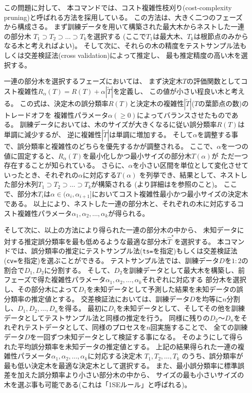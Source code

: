 この問題に対して、
本コマンドでは、コスト複雑性枝刈り(cost-complexity pruning)と呼ばれる方法\cite{Breiman84}を採用している。
この方法は、大きく二つのフェーズから構成さる。
まず訓練データを用いて構築された最大木からネストした一連の部分木
$T_1 \supset T_2 \supset \dots \supset T_k$を選択する
(ここで$T_1$は最大木、$T_k$は根節点のみからなる木と考えればよい)。
そして次に、それらの木の精度をテストサンプル法もしくは交差検証法(cross validation)によって推定し、
最も推定精度の高い木を選択する。

一連の部分木を選択するフェーズにおいては、
まず決定木$T$の評価関数としてコスト複雑性$R_{\alpha}(T)=R(T)+\alpha|\tilde{T}|$を定義し、
この値が小さい程良い木と考える。
この式は、決定木の誤分類率$R(T)$と決定木の複雑性$|\tilde{T}|$($T$の葉節点の数)のトレードオフを
複雑性パラメータ$\alpha(\ge 0)$によってバランスさせたものである。
訓練データにおいては、木のサイズが大きくなるに従い誤分類率$R(T)$は単調に減少するが、
逆に複雑性$|\tilde{T}|$は単調に増加する。
そして$\alpha$を調整する事で、誤分類率と複雑性のどちらを優先するかが調整される。
ここで、$\alpha$を一つの値に固定すると、$R_{\alpha}(T)$を最小化しかつ最小サイズの部分木$T(\alpha)$が
ただ一つ存在することが知られている。
さらに、$\alpha$を小さい区間を単位として変化させていったとき、それぞれの$\alpha$に対応する$T(\alpha)$
を列挙でき、結果として、ネストした部分木列$T_1 \supset T_2 \supset \dots \supset T_k$が構築される
(より詳細は\cite{Breiman84}を参照のこと)。
ここで、部分木$T_i$は$\alpha \in (\alpha_i,\alpha_{i+1}]$においてコスト複雑性最小かつ最小サイズの決定木である。
以上により、ネストした一連の部分木と、それぞれの木に対応するコスト複雑性パラメータ$\alpha_1,\alpha_2,\dots,\alpha_k$が得られる。

そして次に、以上の方法により得られた一連の部分木の中から、
未知データに対する推定誤分類率を最も低めるような最適な部分木$\hat{T}^*$を選択する。
本コマンドでは、誤分類率の推定にテストサンプル法(\verb|ts=|を指定)もしくは交差検証法(\verb|cv=|を指定)を選ぶことができる。
テストサンプル法では、訓練データ$D$を$1:2$の割合で$D_1,D_2$に分割する。
そして、$D_2$を訓練データとして最大木を構築し、前フェーズで得た複雑性パラメータ$\alpha_1,\alpha_2,\dots,\alpha_k$それぞれに対応する
部分木を選択し、その部分木によって$D_1$を未知データとして予測した結果を未知データの誤分類率の推定値とする。
交差検証法においては、訓練データ$D$を均等に$n$分割し、$D_1,D_2,\dots,D_n$を得る。
最初に$D_1$を未知データとして、そしてその他を訓練データとしてテストサンプル法と同様の推定を行う。
同様に残りの$D_2$〜$D_n$をそれぞれテストデータとして、同様のプロセスを$n$回実施することで、
全ての訓練データ$D$を一回ずつ未知データとして検証する事になる。
そのようにして得られた平均誤分類率を未知データの推定値とする。
上記の結果得られた一連の複雑性パラメータ$\alpha_1,\alpha_2,\dots,\alpha_k$に対応する決定木
$T_1, T_2, \dots, T_k$
のうち、誤分類率が最も低い決定木を最適な決定木として選択する。
また、最小誤分類率に標準誤差を加えた誤分類率より小さい部分木の中から、
サイズの最も小さいサイズの木を選ぶ事も可能である(これは「1SEルール」と呼ばれる)。

